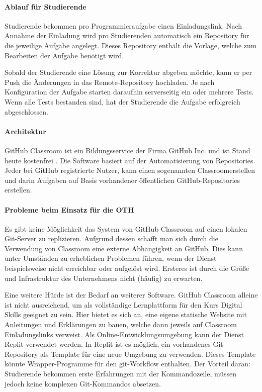 \paragraph{Ablauf für Studierende}
Studierende bekommen pro Programmieraufgabe einen Einladungslink.
Nach Annahme der Einladung wird pro Studierenden automatisch ein Repository für
die jeweilige Aufgabe angelegt. Dieses Repository enthält die Vorlage,
welche zum Bearbeiten der Aufgabe benötigt wird.

Sobald der Studierende eine Lösung zur Korrektur abgeben möchte, kann er per
Push die Änderungen in das Remote-Repository hochladen. Je nach Konfiguration
der Aufgabe starten daraufhin serverseitig ein oder mehrere Tests. Wenn alle
Tests bestanden sind, hat der Studierende die Aufgabe erfolgreich abgeschlossen.

\paragraph{Architektur} %
GitHub Classroom ist ein Bildungsservice der Firma GitHub Inc. und ist Stand
heute kostenfrei \cite{github-classroom-kostenlos}. Die Software basiert auf der Automatisierung von Repositories. Jeder bei GitHub registrierte Nutzer, kann
einen sogenannten \glqq Classroom\grqq erstellen und darin Aufgaben auf Basis
vorhandener öffentlichen GitHub-Repositories erstellen.

\paragraph{Probleme beim Einsatz für die OTH}
Es gibt keine Möglichkeit das System von GitHub Classroom auf einen lokalen
Git-Server zu replizieren. Aufgrund dessen schafft man sich durch die
Verwendung von Classroom eine externe Abhängigkeit an GitHub. Dies kann unter
Umständen zu erheblichen Problemen führen, wenn der Dienst beispielsweise
nicht erreichbar oder aufgelöst wird. Ersteres ist durch die Größe und
Infrastruktur des Unternehmens nicht (häufig) zu erwarten.

Eine weitere Hürde ist der Bedarf an weiterer Software. GitHub Classroom alleine
ist nicht ausreichend, um als vollständige Lernplattform für den Kurs Digital
Skills geeignet zu sein. Hier bietet es sich an, eine eigene statische Website
mit Anleitungen und Erklärungen zu bauen, welche dann jeweils auf Classroom
Einladungslinks verweist. Als Online-Entwicklungsumgebung kann der Dienst Replit
verwendet werden. In Replit ist es möglich, ein vorhandenes Git-Repository als
Template für eine neue Umgebung zu verwenden. Dieses Template könnte
Wrapper-Programme für den git-Workflow enthalten. Der Vorteil daran:
Studierende bekommen erste Erfahrungen mit der Kommandozeile, müssen jedoch
keine komplexen Git-Kommandos absetzen.
